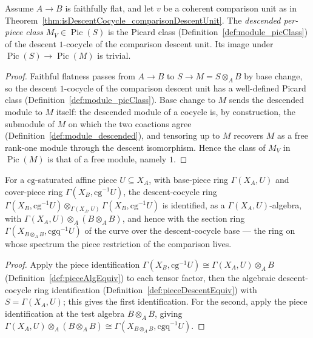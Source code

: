 \begin{definition}
  \label{def:comparisonDescentClass}
  \leanok
  Assume \(A \to B\) is faithfully flat, and let \(v\) be a coherent comparison unit as in
  Theorem~\ref{thm:isDescentCocycle_comparisonDescentUnit}. The \emph{descended per-piece class}
  \(M_V \in \operatorname{Pic}(S)\) is the Picard class (Definition~\ref{def:module_picClass}) of the
  descent \(1\)-cocycle of the comparison descent unit. Its image under \(\operatorname{Pic}(S) \to
  \operatorname{Pic}(M)\) is trivial.
\end{definition}
\begin{proof}
  \leanok
  Faithful flatness passes from \(A \to B\) to \(S \to M = S \otimes_A B\) by base change, so the
  descent \(1\)-cocycle of the comparison descent unit has a well-defined Picard class
  (Definition~\ref{def:module_picClass}). Base change to \(M\) sends the descended module to \(M\)
  itself: the descended module of a cocycle is, by construction, the submodule of \(M\) on which the
  two coactions agree (Definition~\ref{def:module_descended}), and tensoring up to \(M\) recovers
  \(M\) as a free rank-one module through the descent isomorphism. Hence the class of \(M_V\) in
  \(\operatorname{Pic}(M)\) is that of a free module, namely \(1\).
\end{proof}

\begin{definition}
  \label{def:pieceDescentGeom}
  \leanok
  For a \(\mathrm{cg}\)-saturated affine piece \(U \subseteq X_A\), with base-piece ring \(\Gamma(X_A,
  U)\) and cover-piece ring \(\Gamma(X_B, \mathrm{cg}^{-1}U)\), the descent-cocycle ring
  \(\Gamma(X_B, \mathrm{cg}^{-1}U) \otimes_{\Gamma(X_A, U)} \Gamma(X_B, \mathrm{cg}^{-1}U)\) is
  identified, as a \(\Gamma(X_A, U)\)-algebra, with \(\Gamma(X_A, U) \otimes_A (B \otimes_A B)\), and
  hence with the section ring \(\Gamma(X_{B \otimes_A B}, \mathrm{cgq}^{-1}U)\) of the curve over the
  descent-cocycle base --- the ring on whose spectrum the piece restriction of the comparison lives.
\end{definition}
\begin{proof}
  \leanok
  Apply the piece identification \(\Gamma(X_B, \mathrm{cg}^{-1}U) \cong \Gamma(X_A, U) \otimes_A B\)
  (Definition~\ref{def:pieceAlgEquiv}) to each tensor factor, then the algebraic descent-cocycle
  ring identification (Definition~\ref{def:pieceDescentEquiv}) with \(S = \Gamma(X_A, U)\); this
  gives the first identification. For the second, apply the piece identification at the test algebra
  \(B \otimes_A B\), giving \(\Gamma(X_A, U) \otimes_A (B \otimes_A B) \cong \Gamma(X_{B \otimes_A
  B}, \mathrm{cgq}^{-1}U)\).
\end{proof}

